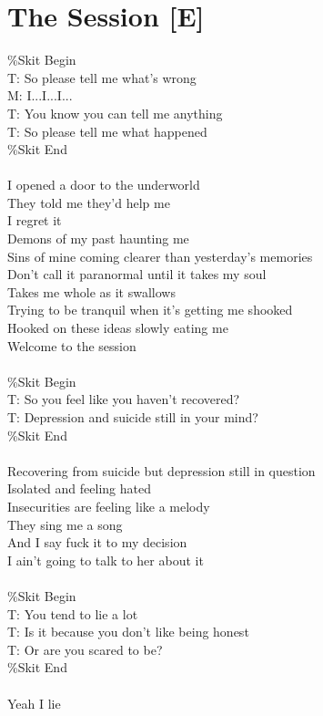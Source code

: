 \documentclass[12pt, b5paper, oneside]{book}
\begin{document}
\newpage
\section{The Session [E]}
\%Skit Begin
\\T: So please tell me what's wrong
\\M: I...I...I...
\\T: You know you can tell me anything
\\T: So please tell me what happened
\\\%Skit End
\\\\I opened a door to the underworld
\\They told me they'd help me
\\I regret it
\\Demons of my past haunting me
\\Sins of mine coming clearer than yesterday's memories
\\Don't call it paranormal until it takes my soul
\\Takes me whole as it swallows
\\Trying to be tranquil when it's getting me shooked
\\Hooked on these ideas slowly eating me
\\Welcome to the session
\\\\\%Skit Begin
\\T: So you feel like you haven't recovered?
\\T: Depression and suicide still in your mind?
\\\%Skit End
\\\\Recovering from suicide but depression still in question
\\Isolated and feeling hated
\\Insecurities are feeling like a melody
\\They sing me a song
\\And I say fuck it to my decision
\\I ain't going to talk to her about it
\\\\\%Skit Begin
\\T: You tend to lie a lot
\\T: Is it because you don't like being honest
\\T: Or are you scared to be?
\\\%Skit End
\\\\Yeah I lie
\end{document}
